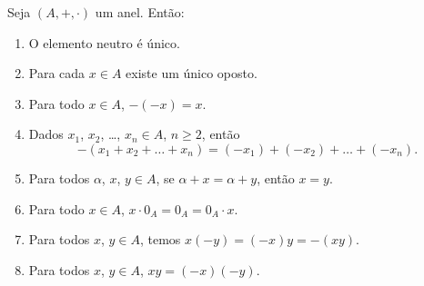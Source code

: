 \begin{proposicao}
    Seja $(A, + , \cdot)$ um anel. Ent\~ao:
    \begin{enumerate}[label={\roman*})]
        \item O elemento neutro {\'e} {\'u}nico.
        \item Para cada $x \in A$ existe um {\'u}nico oposto.
        \item Para todo $x \in A$, $-(-x) = x$.
        \item Dados $x_{1}$, $x_{2}$, \dots, $x_n \in A$, $n \geqslant 2$, ent{\~a}o
        \[
            -(x_1 + x_2 + \dots + x_n) = (-x_1) + (-x_2) + \dots + (-x_n).
        \]
        \item Para todos $\alpha$, $x$, $y \in A$, se $\alpha + x = \alpha + y$, ent{\~a}o $x = y$.
        \item Para todo $x \in A$, $x\cdot 0_A = 0_A = 0_A\cdot x$.
        \item Para todos $x$, $y \in A$, temos $x(-y) = (-x)y = -(xy)$.
        \item Para todos $x$, $y \in A$, $xy = (-x)(-y)$.
    \end{enumerate}
\end{proposicao}
